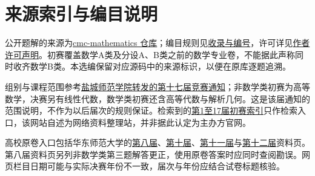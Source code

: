 \documentclass[12pt,fontset=fandol]{ctexart}
\begin{document}
\section{来源索引与编目说明}

\label{sec:sources}
公开题解的来源为\href{https://github.com/lzxcr/cmc-mathematics}{cmc-mathematics 仓库}；编目规则见\href{https://github.com/lzxcr/cmc-mathematics/blob/64916fa1fdbc3e444a652eca204d5669058ee321/docs/COVERAGE.md}{收录与编号}，许可详见\href{https://github.com/lzxcr/cmc-mathematics/blob/64916fa1fdbc3e444a652eca204d5669058ee321/LICENSE.md}{作者许可声明}。初赛覆盖数学A类及分设A、B类之前的数学专业卷，不能据此声称同时收齐数学B类。本选编保留对应源码中的来源标识，以便在原库逐题追溯。

组别与课程范围参考\href{https://ist.yctu.edu.cn/2025/0926/c3316a140974/page.htm}{盐城师范学院转发的第十七届竞赛通知}；非数学类初赛为高等数学，决赛另有线性代数，数学类初赛还含高等代数与解析几何。这是该届通知的范围说明，不作为以后届次的规则保证。检索到的\href{https://www.cmathc.org.cn/st/560.html}{第1至17届初赛索引}只作检索入口，该网站自述为网络资料整理站，并非据此认定为主办方官网。

高校原卷入口包括华东师范大学的\href{https://math.ecnu.edu.cn/llin/20161022.HTM}{第八届}、\href{https://math.ecnu.edu.cn/llin/20181027.HTM}{第十届}、\href{https://math.ecnu.edu.cn/llin/20191026.HTM}{第十一届}与\href{https://math.ecnu.edu.cn/llin/20201128.HTM}{第十二届}资料页。第八届资料页另列非数学类第三题解答更正，使用原卷答案时应同时查阅勘误。网页栏目日期可能与实际决赛年份不一致，届次与年份应结合试卷标题核验。
\end{document}
